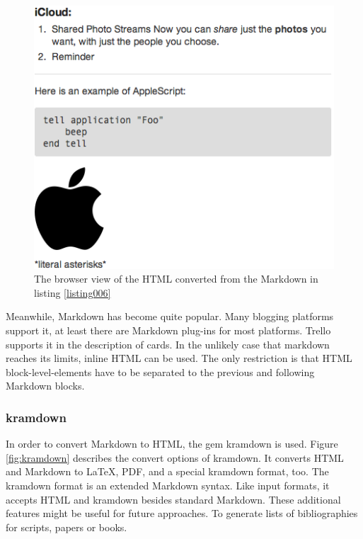 \begin{figure}[htb]
\centering
\includegraphics[scale=0.6]{figures/markdown-result}
\caption{The browser view of the HTML converted from the Markdown in listing \ref{listing006}}
\label{fig:markdown-result}
\end{figure}

Meanwhile, Markdown has become quite popular. Many blogging platforms support it, at least there are Markdown plug-ins for most platforms. Trello supports it in the description of cards. In the unlikely case that markdown reaches its limits, inline HTML can be used. The only restriction is that HTML block-level-elements have to be separated to the previous and following Markdown blocks.

\subsubsection{kramdown}

In order to convert Markdown to HTML, the gem kramdown is used. Figure \ref{fig:kramdown} describes the convert options of kramdown. It converts HTML and Markdown to LaTeX, PDF, and a special kramdown format, too. The kramdown format is an extended Markdown syntax. Like input formats, it accepts HTML and kramdown besides standard Markdown. \cite{kramdown} These additional features might be useful for future approaches. To generate lists of bibliographies for scripts, papers or books.

